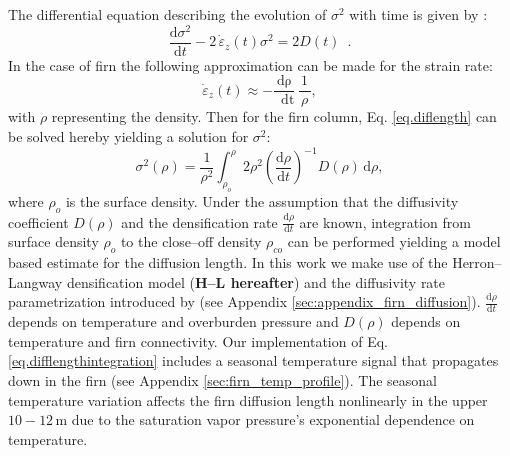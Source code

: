 \documentclass[11pt, draftcls, onecolumn]{IEEEtran} %
\numberwithin{equation}{section}
\numberwithin{table}{section}
\numberwithin{figure}{section}
\begin{document}
The differential equation describing the evolution of $\sigma^2$ with time is 
given by \citep{Johnsen1977}: 
\begin{equation}
\frac{\mathrm{d}\sigma^2}{\mathrm{d}t} - 2\,\dot{\varepsilon}_z\!\left( t \right) \sigma^2 = 
2D\!\left( t \right) \enspace.
\label{eq.diflength}
\end{equation}
In the case of firn the following approximation can be made for the strain rate:
\begin{equation}
\dot{\varepsilon}_z \left(
	t \right) \approx -\frac{\mathrm{d\rho}}{\,\,\,\mathrm{d t}}\,\frac{\,1\,}{\,\rho\,},
\label{eq.strainrate}
\end{equation}
with $\rho$ representing the density.
Then for the firn column, Eq. \ref{eq.diflength} can be solved hereby yielding a solution for $\sigma^2$:
\begin{equation}
\sigma^2 \left( \rho \right) = \frac{\,1\,}{\rho^2}\int_{\rho_o}^{\rho}2\rho^2 
{\left( \frac{\mathrm{d}\rho}{\mathrm{d}t}\right)}^{-1}\! D \!\left( \rho \right) \,\mathrm{d}\rho, 
\label{eq.difflengthintegration}
\end{equation}
where  $\rho_o$ is the surface density. 
Under the assumption that the diffusivity coefficient $D\left(\rho\right)$ and the
densification rate   $\frac{\mathrm{d}\rho}{\mathrm{d}t}$ are known,
integration from surface density $\rho_o$ to the close--off density $\rho_{co}$
can be performed yielding a model based estimate for the diffusion length.
In this work we make use of the Herron--Langway densification model (\textbf{H--L hereafter})
and the diffusivity rate parametrization introduced by \cite{Johnsen2000} (see Appendix \ref{sec:appendix_firn_diffusion}).
$\frac{\mathrm{d}\rho}{\mathrm{d}t}$ depends on temperature and overburden pressure
and $D\left(\rho\right)$ depends on temperature and firn connectivity.
Our implementation of Eq. \ref{eq.difflengthintegration} includes a seasonal temperature signal that propagates down in the firn (see Appendix \ref{sec:firn_temp_profile}).
The seasonal temperature variation affects the firn diffusion length nonlinearly in the upper $10-12 \, \mathrm{m}$ due to the saturation vapor pressure's exponential
dependence on temperature.
\end{document}
